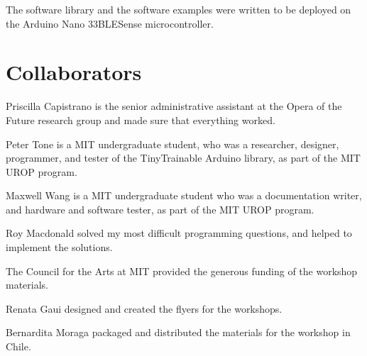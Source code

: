 The software library and the software examples were written to be deployed on the Arduino Nano 33\acrshort{BLE}Sense microcontroller.

\section{Collaborators}

Priscilla Capistrano is the senior administrative assistant at the Opera of the Future research group and made sure that everything worked.

Peter Tone is a MIT undergraduate student, who was a researcher, designer, programmer, and tester of the TinyTrainable Arduino library, as part of the MIT UROP program.

Maxwell Wang is a MIT undergraduate student who was a documentation writer, and hardware and software tester, as part of the MIT UROP program.

Roy Macdonald solved my most difficult programming questions, and helped to implement the solutions.

The Council for the Arts at MIT provided the generous funding of the workshop materials.

Renata Gaui designed and created the flyers for the workshops.

Bernardita Moraga packaged and distributed the materials for the workshop in Chile.

\newpage
